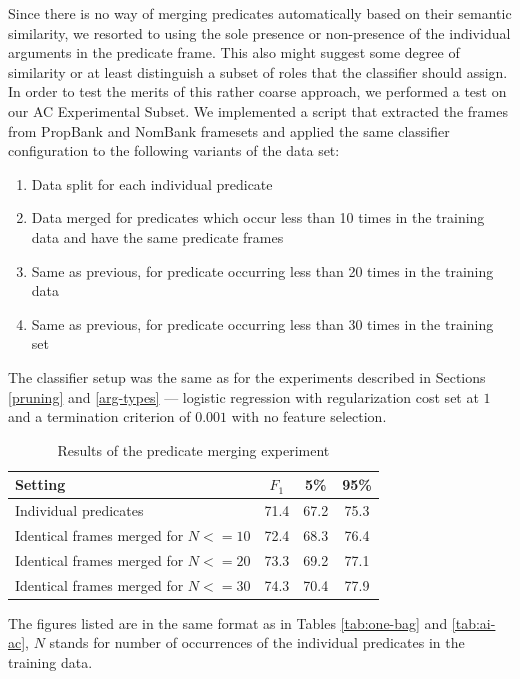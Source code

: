\documentclass[12pt,notitlepage]{report}
\begin{document}
Since there is no way of merging predicates automatically based on their semantic similarity, we resorted to using the sole presence or non-presence of the individual arguments in the predicate frame. This also might suggest some degree of similarity or at least distinguish a subset of roles that the classifier should assign. In order to test the merits of this rather coarse approach, we performed a test on our AC Experimental Subset. We implemented a script that extracted the frames from PropBank and NomBank framesets and applied the same classifier configuration to the following variants of the data set:
\begin{enumerate}
    \item Data split for each individual predicate
    \item Data merged for predicates which occur less than 10 times in the training data and have the same predicate frames
    \item Same as previous, for predicate occurring less than 20 times in the training data 
    \item Same as previous, for predicate occurring less than 30 times in the training set
\end{enumerate}
The classifier setup was the same as for the experiments described in Sections \ref{pruning} and \ref{arg-types} --- logistic regression with regularization cost set at $1$ and a termination criterion of $0.001$ with no feature selection.

\begin{table}[htb]\label{tab:merge}
\caption{Results of the predicate merging experiment}\footnotesize
\begin{center}
\begin{tabular}{|l|c|c|c|}\hline
\bf Setting & $F_1$ & \bf 5\% & \bf 95\% \\\hline
Individual predicates & 71.4 & 67.2 & 75.3 \\
Identical frames merged for $N <= 10$ & 72.4 & 68.3 & 76.4 \\
Identical frames merged for $N <= 20$ & 73.3 & 69.2 & 77.1 \\
Identical frames merged for $N <= 30$ & 74.3 & 70.4 & 77.9 \\\hline
\end{tabular}
\end{center}
The figures listed are in the same format as in Tables \ref{tab:one-bag} and \ref{tab:ai-ac}, $N$ stands for number of occurrences of the individual predicates in the training data.
\end{table}
\end{document}
